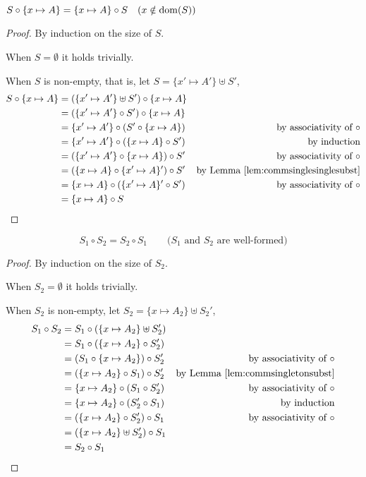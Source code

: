 \begin{lemma}\label{lem:commsingletonsubst}
	$S \circ \{x\mapsto A\} = \{x\mapsto A\} \circ S
	\quad (x \notin \mathop{\mathrm{dom}}(S))$
\end{lemma}
\begin{proof} By induction on the size of $S$.

When $S=\emptyset$ it holds trivially.

When $S$ is non-empty, that is, let $S=\{x'\mapsto A'\}\uplus S'$,
\begin{align*}
S\circ\{x\mapsto A\}
&= (\{x'\mapsto A'\}\uplus S') \circ \{x\mapsto A\} \\
&= (\{x'\mapsto A'\}\circ S') \circ \{x\mapsto A\} \\
&= \{x'\mapsto A'\} \circ (S' \circ \{x\mapsto A\})
& \text{by associativity of $\circ$} \\
&= \{x'\mapsto A'\} \circ (\{x\mapsto A\} \circ S')
& \text{by induction} \\
&= (\{x'\mapsto A'\} \circ \{x\mapsto A\}) \circ S'
& \text{by associativity of $\circ$} \\
&= (\{x\mapsto A\} \circ \{x'\mapsto A\}') \circ S'
& \text{by Lemma \ref{lem:commsinglesinglesubst}} \\
&= \{x\mapsto A\} \circ (\{x'\mapsto A\}' \circ S')
& \text{by associativity of $\circ$} \\
&= \{x\mapsto A\} \circ S
\end{align*}
\end{proof}

\begin{theorem}
\[ S_1\circ S_2 = S_2\circ S_1 \qquad\text{($S_1$ and $S_2$ are well-formed)} \]
\end{theorem}
\begin{proof}
By induction on the size of $S_2$.

When $S_2=\emptyset$ it holds trivially.

When $S_2$ is non-empty, let $S_2=\{x\mapsto A_2\}\uplus S_2'$,
\begin{align*}
S_1 \circ S_2
	&= S_1 \circ (\{x\mapsto A_2\}\uplus S_2') \\
	&= S_1 \circ (\{x\mapsto A_2\}\circ S_2') \\
	&= (S_1 \circ \{x\mapsto A_2\}) \circ S_2'
	& \text{by associativity of $\circ$} \\
	&= (\{x\mapsto A_2\}\circ S_1) \circ S_2'
	& \text{by Lemma \ref{lem:commsingletonsubst}} \\
	&= \{x\mapsto A_2\}\circ (S_1 \circ S_2')
	& \text{by associativity of $\circ$} \\
	&= \{x\mapsto A_2\}\circ (S_2' \circ S_1)
	& \text{by induction} \\
	&= (\{x\mapsto A_2\}\circ S_2') \circ S_1
	& \text{by associativity of $\circ$} \\
	&= (\{x\mapsto A_2\}\uplus S_2') \circ S_1 \\
	&= S_2 \circ S_1
\end{align*}
\end{proof}


